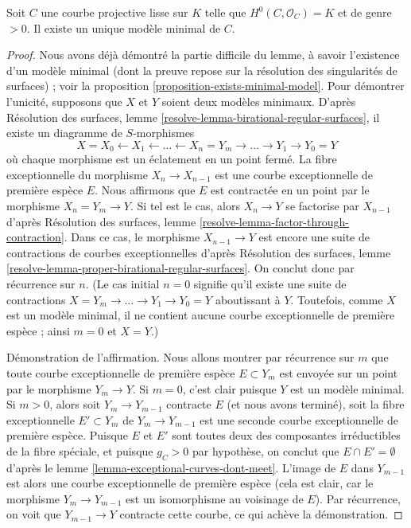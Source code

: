 \begin{lemma}
\label{lemma-minimal-model-unique}
Soit $C$ une courbe projective lisse sur $K$ telle que
$H^0(C, \mathcal{O}_C) = K$ et de genre $> 0$.
Il existe un unique modèle minimal de $C$.
\end{lemma}

\begin{proof}
Nous avons déjà démontré la partie difficile du lemme, à savoir l'existence
d'un modèle minimal (dont la preuve repose sur la
résolution des singularités de surfaces) ; voir la
proposition \ref{proposition-exists-minimal-model}.
Pour démontrer l'unicité, supposons que $X$ et $Y$ soient deux
modèles minimaux. D'après
Résolution des surfaces, lemme \ref{resolve-lemma-birational-regular-surfaces},
il existe un diagramme de $S$-morphismes
$$
X = X_0 \leftarrow X_1 \leftarrow \ldots \leftarrow X_n = Y_m
\to \ldots \to Y_1 \to Y_0 = Y
$$
où chaque morphisme est un éclatement en un point fermé. La
fibre exceptionnelle du morphisme $X_n \to X_{n - 1}$ est une
courbe exceptionnelle de première espèce $E$. Nous affirmons que $E$ est
contractée en un point par le morphisme $X_n = Y_m \to Y$.
Si tel est le cas, alors $X_n \to Y$ se factorise par $X_{n - 1}$ d'après
Résolution des surfaces, lemme \ref{resolve-lemma-factor-through-contraction}.
Dans ce cas, le morphisme $X_{n - 1} \to Y$ est encore une suite de
contractions de courbes exceptionnelles d'après
Résolution des surfaces, lemme
\ref{resolve-lemma-proper-birational-regular-surfaces}.
On conclut donc par récurrence sur $n$. (Le cas initial $n = 0$ signifie
qu'il existe une suite de contractions
$X = Y_m \to \ldots \to Y_1 \to Y_0 = Y$
aboutissant à $Y$. Toutefois, comme $X$ est un modèle minimal, il ne contient
aucune courbe exceptionnelle de première espèce ; ainsi $m = 0$ et $X = Y$.)

\medskip\noindent
Démonstration de l'affirmation. Nous allons montrer par récurrence sur $m$ que toute courbe
exceptionnelle de première espèce $E \subset Y_m$ est envoyée sur un point
par le morphisme $Y_m \to Y$. Si $m = 0$, c'est clair puisque
$Y$ est un modèle minimal. Si $m > 0$, alors soit
$Y_m \to Y_{m - 1}$ contracte $E$ (et nous avons terminé), soit
la fibre exceptionnelle $E' \subset Y_m$ de $Y_m \to Y_{m - 1}$
est une seconde courbe exceptionnelle de première espèce.
Puisque $E$ et $E'$ sont toutes deux des composantes irréductibles de la fibre
spéciale, et puisque $g_C > 0$ par hypothèse, on conclut que
$E \cap E' = \emptyset$ d'après le
lemme \ref{lemma-exceptional-curves-dont-meet}.
L'image de $E$ dans $Y_{m - 1}$ est alors une courbe
exceptionnelle de première espèce (cela est clair, car le morphisme
$Y_m \to Y_{m - 1}$ est un isomorphisme au voisinage de $E$).
Par récurrence, on voit que $Y_{m - 1} \to Y$ contracte cette courbe,
ce qui achève la démonstration.
\end{proof}

